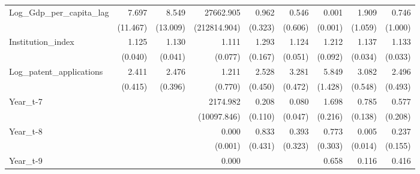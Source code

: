 \begin{table}[htbp]
\begin{tabular}{l*{8}{D{.}{.}{-1}}}
Log\_Gdp\_per\_capita\_lag&       7.697         &       8.549         &   27662.905         &       0.962         &       0.546         &       0.001\sym{***}&       1.909         &       0.746         \\
                    &    (11.467)         &    (13.009)         &(212814.904)         &     (0.323)         &     (0.606)         &     (0.001)         &     (1.059)         &     (1.000)         \\
Institution\_index   &       1.125\sym{***}&       1.130\sym{***}&       1.111\sym{\%}  &       1.293\sym{**} &       1.124\sym{**} &       1.212\sym{**} &       1.137\sym{***}&       1.133\sym{***}\\
                    &     (0.040)         &     (0.041)         &     (0.077)         &     (0.167)         &     (0.051)         &     (0.092)         &     (0.034)         &     (0.033)         \\
Log\_patent\_applications&       2.411\sym{***}&       2.476\sym{***}&       1.211         &       2.528\sym{***}&       3.281\sym{***}&       5.849\sym{***}&       3.082\sym{***}&       2.496\sym{***}\\
                    &     (0.415)         &     (0.396)         &     (0.770)         &     (0.450)         &     (0.472)         &     (1.428)         &     (0.548)         &     (0.493)         \\
Year\_t-7            &                     &                     &    2174.982\sym{*}  &       0.208\sym{***}&       0.080\sym{***}&       1.698\sym{***}&       0.785         &       0.577\sym{\%}  \\
                    &                     &                     & (10097.846)         &     (0.110)         &     (0.047)         &     (0.216)         &     (0.138)         &     (0.208)         \\
Year\_t-8            &                     &                     &       0.000         &       0.833         &       0.393         &       0.773         &       0.005\sym{**} &       0.237\sym{**} \\
                    &                     &                     &     (0.001)         &     (0.431)         &     (0.323)         &     (0.303)         &     (0.014)         &     (0.155)         \\
Year\_t-9            &                     &                     &       0.000\sym{***}&                     &                     &       0.658\sym{**} &       0.116         &       0.416         \\

\end{tabular}
\end{table}
